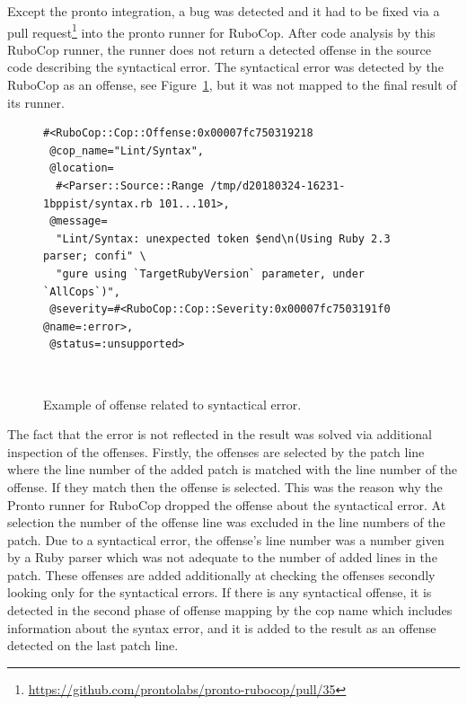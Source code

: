 Except the pronto integration, a bug was detected and it had to be fixed via a pull request\footnote{\url{https://github.com/prontolabs/pronto-rubocop/pull/35}} into the pronto runner for RuboCop. After code analysis by this RuboCop runner, the runner does not return a detected offense in the source code describing the syntactical error. The syntactical error was detected by the RuboCop as an offense, see Figure~\ref{fig:syntax_offense}, but it was not mapped to the final result of its runner.

\begin{figure}[H]
\begin{lstlisting}[basicstyle=\scriptsize, xleftmargin=.14\textwidth]
#<RuboCop::Cop::Offense:0x00007fc750319218
 @cop_name="Lint/Syntax",
 @location=
  #<Parser::Source::Range /tmp/d20180324-16231-1bppist/syntax.rb 101...101>,
 @message=
  "Lint/Syntax: unexpected token $end\n(Using Ruby 2.3 parser; confi" \
  "gure using `TargetRubyVersion` parameter, under `AllCops`)",
 @severity=#<RuboCop::Cop::Severity:0x00007fc7503191f0 @name=:error>,
 @status=:unsupported>
\end{lstlisting}  
\hfill\\[-3em]
\caption{Example of offense related to syntactical error.}
\label{fig:syntax_offense}
\end{figure}

The fact that the error is not reflected in the result was solved via additional inspection of the offenses. Firstly, the offenses are selected by the patch line where the line number of the added patch is matched with the line number of the offense. If they match then the offense is selected. This was the reason why the Pronto runner for RuboCop dropped the offense about the syntactical error. At selection the number of the offense line was excluded in the line numbers of the patch. Due to a syntactical error, the offense's line number was a number given by a Ruby parser which was not adequate to the number of added lines in the patch. These offenses are added additionally at checking the offenses secondly looking only for the syntactical errors. If there is any syntactical offense, it is detected in the second phase of offense mapping by the cop name which includes information about the syntax error, and it is added to the result as an offense detected on the last patch line.

